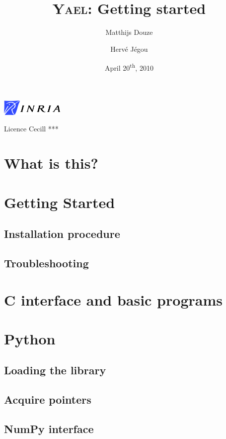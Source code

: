 \documentclass[a4paper,11pt,notitlepage,final,twoside]{report}
\title{~\vspace{9cm} \\ \textsc{Yael}: Getting started}
\author{Matthijs Douze \and Herv\'e J\'egou}
\date{April 20\textsuperscript{th}, 2010}
\begin{document}
\maketitle
\thispagestyle{empty}

\vfill

\includegraphics[width=3cm]{./figs/logoinria}


Licence Cecill ***


\tableofcontents            %


\chapter{What is this?}


\chapter{Getting Started}

\section{Installation procedure}



\section{Troubleshooting}



\chapter{C interface and basic programs}

\chapter{Python}

\section{Loading the library}

\section{Acquire pointers}

\section{NumPy interface}
\end{document}
